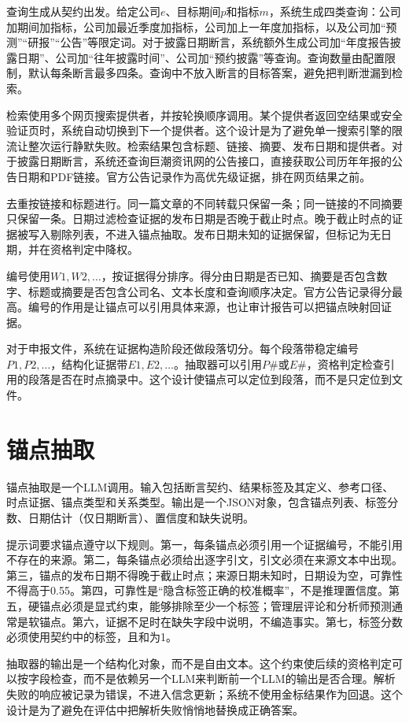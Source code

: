 查询生成从契约出发。给定公司$e$、目标期间$p$和指标$m$，系统生成四类查询：公司加期间加指标，公司加最近季度加指标，公司加上一年度加指标，以及公司加“预测”“研报”“公告”等限定词。对于披露日期断言，系统额外生成公司加“年度报告披露日期”、公司加“往年披露时间”、公司加“预约披露”等查询。查询数量由配置限制，默认每条断言最多四条。查询中不放入断言的目标答案，避免把判断泄漏到检索。

检索使用多个网页搜索提供者，并按轮换顺序调用。某个提供者返回空结果或安全验证页时，系统自动切换到下一个提供者。这个设计是为了避免单一搜索引擎的限流让整次运行静默失败。检索结果包含标题、链接、摘要、发布日期和提供者。对于披露日期断言，系统还查询巨潮资讯网的公告接口，直接获取公司历年年报的公告日期和PDF链接。官方公告记录作为高优先级证据，排在网页结果之前。

去重按链接和标题进行。同一篇文章的不同转载只保留一条；同一链接的不同摘要只保留一条。日期过滤检查证据的发布日期是否晚于截止时点。晚于截止时点的证据被写入剔除列表，不进入锚点抽取。发布日期未知的证据保留，但标记为无日期，并在资格判定中降权。

编号使用$W1,W2,\dots$，按证据得分排序。得分由日期是否已知、摘要是否包含数字、标题或摘要是否包含公司名、文本长度和查询顺序决定。官方公告记录得分最高。编号的作用是让锚点可以引用具体来源，也让审计报告可以把锚点映射回证据。

对于申报文件，系统在证据构造阶段还做段落切分。每个段落带稳定编号$P1,P2,\dots$，结构化证据带$E1,E2,\dots$。抽取器可以引用$P\#$或$E\#$，资格判定检查引用的段落是否在时点摘录中。这个设计使锚点可以定位到段落，而不是只定位到文件。

\section{锚点抽取}

锚点抽取是一个LLM调用。输入包括断言契约、结果标签及其定义、参考口径、时点证据、锚点类型和关系类型。输出是一个JSON对象，包含锚点列表、标签分数、日期估计（仅日期断言）、置信度和缺失说明。

提示词要求锚点遵守以下规则。第一，每条锚点必须引用一个证据编号，不能引用不存在的来源。第二，每条锚点必须给出逐字引文，引文必须在来源文本中出现。第三，锚点的发布日期不得晚于截止时点；来源日期未知时，日期设为空，可靠性不得高于0.55。第四，可靠性是“隐含标签正确的校准概率”，不是推理置信度。第五，硬锚点必须是显式约束，能够排除至少一个标签；管理层评论和分析师预测通常是软锚点。第六，证据不足时在缺失字段中说明，不编造事实。第七，标签分数必须使用契约中的标签，且和为1。

抽取器的输出是一个结构化对象，而不是自由文本。这个约束使后续的资格判定可以按字段检查，而不是依赖另一个LLM来判断前一个LLM的输出是否合理。解析失败的响应被记录为错误，不进入信念更新；系统不使用金标结果作为回退。这个设计是为了避免在评估中把解析失败悄悄地替换成正确答案。

